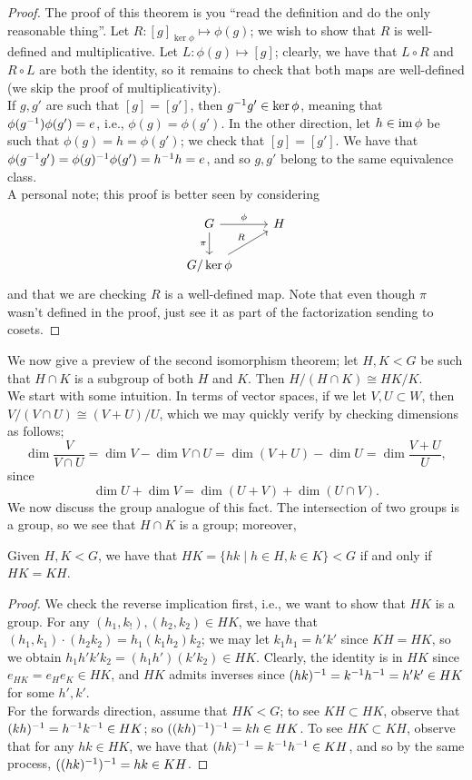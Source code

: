 \begin{proof}
    The proof of this theorem is you ``read the definition and do the only reasonable thing''. Let $R : [g]_{\ker \phi} \mapsto \phi(g)$; we wish to show that $R$ is well-defined and multiplicative. Let $L : \phi(g) \mapsto [g]$; clearly, we have that $L \circ R$ and $R \circ L$ are both the identity, so it remains to check that both maps are well-defined (we skip the proof of multiplicativity).
    \\[8pt]
    If $g, g'$ are such that $[g] = [g']$, then $g ^{-1} g' \in \ker \phi$, meaning that $\phi(g ^{-1}) \phi(g') = e$, i.e., $\phi(g) = \phi(g')$. In the other direction, let $h \in \operatorname{im} \phi$ be such that $\phi(g) = h = \phi(g')$; we check that $[g] = [g']$. We have that $\phi(g^{-1} g') = \phi(g)^{-1} \phi(g') = h ^{-1} h = e$, and so $g, g'$ belong to the same equivalence class.
    \\[8pt]
    A personal note; this proof is better seen by considering
    \[ \begin{tikzcd} G \arrow[r,"\phi"] \arrow[d,"\pi"'] & H \\ G/\ker\phi \arrow[ru,"R"] \end{tikzcd} \]
    and that we are checking $R$ is a well-defined map. Note that even though $\pi$ wasn't defined in the proof, just see it as part of the factorization sending to cosets.
\end{proof}
\noindent We now give a preview of the second isomorphism theorem; let $H, K < G$ be such that $H \cap K$ is a subgroup of both $H$ and $K$. Then $H / (H \cap K) \cong HK / K$.
\\[8pt]
We start with some intuition. In terms of vector spaces, if we let $V, U \subset W$, then $V/(V \cap U) \cong (V + U)/U$, which we may quickly verify by checking dimensions as follows;
\[ \dim \frac{V}{V \cap U} = \dim V - \dim V \cap U = \dim (V + U) - \dim U = \dim \frac{V + U}{U}, \]
since
\[ \dim U + \dim V = \dim (U+V) + \dim (U \cap V). \]
We now discuss the group analogue of this fact. The intersection of two groups is a group, so we see that $H \cap K$ is a group; moreover,
\begin{claim}
    Given $H, K < G$, we have that $HK = \{hk \mid h \in H, k \in K\} < G$ if and only if $HK = KH$.
\end{claim}
\begin{proof}
    We check the reverse implication first, i.e., we want to show that $HK$ is a group. For any $(h_1, k_!), (h_2, k_2) \in HK$, we have that $(h_1, k_1) \cdot (h_2 k_2) = h_1 (k_1 h_2) k_2$; we may let $k_1h_1 = h'k'$ since $KH = HK$, so we obtain $h_1 h' k' k_2 = (h_1 h') (k' k_2) \in HK$. Clearly, the identity is in $HK$ since $e_{HK} = e_H e_K \in HK$, and $HK$ admits inverses since $(hk) ^{-1} = k ^{-1} h ^{-1} = h' k' \in HK$ for some $h', k'$.
    \\[8pt]
    For the forwards direction, assume that $HK < G$; to see $KH \subset HK$, observe that $(kh) ^{-1} = h ^{-1} k ^{-1} \in HK$; so $((kh)^{-1})^{-1} = kh \in HK$. To see $HK \subset KH$, observe that for any $hk \in HK$, we have that $(hk)^{-1} = k^{-1} h^{-1} \in KH$, and so by the same process, $((hk)^{-1})^{-1} = hk \in KH$.
\end{proof}
